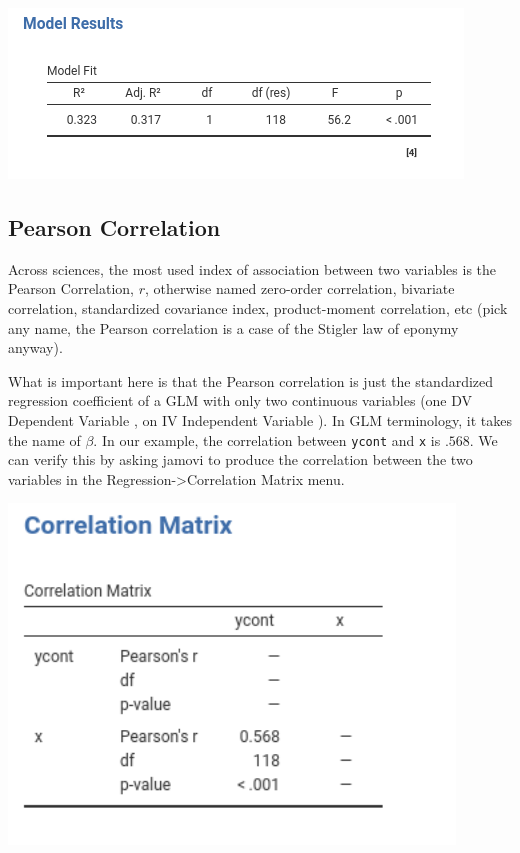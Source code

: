 \documentclass[
]{book}
\begin{document}
\includegraphics[width=0.9\linewidth]{bookletpics/2_output2}

\hypertarget{pearson-correlation}{%
\subsection{Pearson Correlation}\label{pearson-correlation}}

Across sciences, the most used index of association between two variables is the Pearson Correlation, \(r\), otherwise named zero-order correlation, bivariate correlation, standardized covariance index, product-moment correlation, etc (pick any name, the Pearson correlation is a case of the Stigler law of eponymy anyway).

What is important here is that the Pearson correlation is just the standardized regression coefficient of a GLM with only two continuous variables (one {DV {Dependent Variable} }, on {IV {Independent Variable} }). In GLM terminology, it takes the name of \(\beta\). In our example, the correlation
between \texttt{ycont} and \texttt{x} is \(.568\). We can verify this by asking {jamovi} to produce the correlation between the two variables in the {Regression-\textgreater Correlation Matrix} menu.

\includegraphics[width=4.67in]{bookletpics/2_output8}
\end{document}
